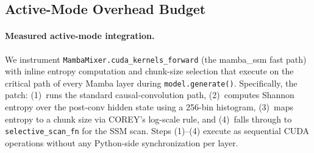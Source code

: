 \begin{table}[h]
\centering
\caption{Real-GPU online scheduler microbenchmark (HF fallback path, moved from main text per reviewer request). Entropy hook runs on real checkpoint activations during generation. RTX~3070: WSL2 CUDA~12.8, 1-sample/0-warmup. RTX~3090: native Linux CUDA~12.1, 1-sample/1-warmup/3-repeat. Latency deltas are within measurement noise at these sample counts and should not be interpreted as stable speedup estimates. Negative delta values ($-3.6\%$ to $-1.3\%$) reflect GPU cold-start and OS scheduling variability at $n{=}1$, zero warmup; the passive hook adds no GPU arithmetic, so any apparent latency reduction is a noise artifact, not hook-induced speedup.}
\label{tab:hook_micro}
\small
{}
\end{table}

\subsection{Active-Mode Overhead Budget}
\label{sec:active_overhead}

\paragraph{Measured active-mode integration.}
We instrument \texttt{MambaMixer.cuda\_kernels\_forward} (the mamba\_ssm fast path) with inline entropy computation and chunk-size selection that execute on the critical path of every Mamba layer during \texttt{model.generate()}.
Specifically, the patch: (1)~runs the standard causal-convolution path, (2)~computes Shannon entropy over the post-conv hidden state using a 256-bin histogram, (3)~maps entropy to a chunk size via COREY's log-scale rule, and (4)~falls through to \texttt{selective\_scan\_fn} for the SSM scan.
Steps (1)--(4) execute as sequential CUDA operations without any Python-side synchronization per layer.

